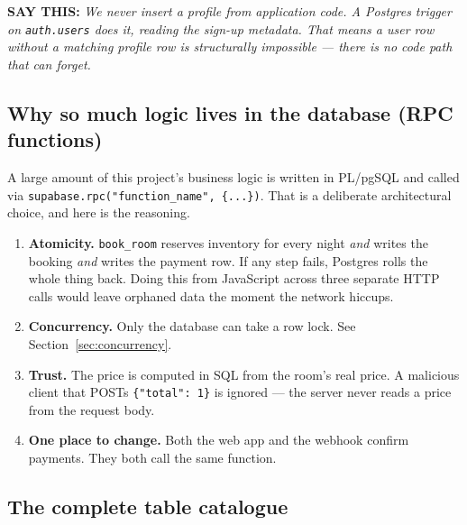 \documentclass[11pt,a4paper]{article}
\newcommand{\saythis}[1]{\begin{saybox}\textbf{\small\color{primary}SAY THIS:} \textit{#1}\end{saybox}}
\begin{document}
\saythis{We never insert a profile from application code. A Postgres trigger on
\texttt{auth.users} does it, reading the sign-up metadata. That means a user row
without a matching profile row is structurally impossible --- there is no code
path that can forget.}

\subsection{Why so much logic lives in the database (RPC functions)}

A large amount of this project's business logic is written in PL/pgSQL and called
via \texttt{supabase.rpc("function\_name", \{...\})}. That is a deliberate
architectural choice, and here is the reasoning.

\begin{enumerate}[leftmargin=*]
  \item \textbf{Atomicity.} \texttt{book\_room} reserves inventory for every night
        \emph{and} writes the booking \emph{and} writes the payment row. If any
        step fails, Postgres rolls the whole thing back. Doing this from
        JavaScript across three separate HTTP calls would leave orphaned data
        the moment the network hiccups.
  \item \textbf{Concurrency.} Only the database can take a row lock. See
        Section~\ref{sec:concurrency}.
  \item \textbf{Trust.} The price is computed in SQL from the room's real price.
        A malicious client that POSTs \texttt{\{"total": 1\}} is ignored --- the
        server never reads a price from the request body.
  \item \textbf{One place to change.} Both the web app and the webhook confirm
        payments. They both call the same function.
\end{enumerate}

\subsection{The complete table catalogue}
\end{document}
